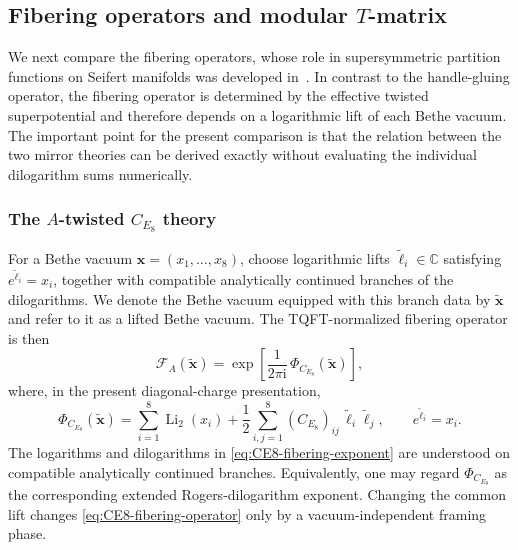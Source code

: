 \documentclass[11pt,a4paper]{article}
\numberwithin{equation}{section}
\begin{document}
\subsection{Fibering operators and modular $T$-matrix}
\label{subsec:fibering-T-matrix}

We next compare the fibering operators, whose role in supersymmetric partition functions on Seifert manifolds was developed in~\cite{Closset:2017zgf,ClossetKimWillett:2018Seifert}.  In contrast to the handle-gluing operator, the fibering operator is determined by the effective twisted superpotential and therefore depends on a logarithmic lift of each Bethe vacuum.  The important point for the present comparison is that the relation between the two mirror theories can be derived exactly without evaluating the individual dilogarithm sums numerically.

\subsubsection{The $A$-twisted $C_{E_8}$ theory}
\label{subsubsec:A-twisted-CE8-T}

For a Bethe vacuum $\boldsymbol x=(x_1,\ldots,x_8)$, choose logarithmic lifts $\widetilde\ell_i\in\mathbb C$ satisfying $e^{\widetilde\ell_i}=x_i$, together with compatible analytically continued branches of the dilogarithms.  We denote the Bethe vacuum equipped with this branch data by $\widetilde{\boldsymbol x}$ and refer to it as a lifted Bethe vacuum.  The TQFT-normalized fibering operator is then
\begin{equation}
  \mathcal F_A(\widetilde{\boldsymbol x})
  =\exp\!\left[
  \frac{1}{2\pi \mathrm{i}}\,
  \Phi_{C_{E_8}}(\widetilde{\boldsymbol x})
  \right],
  \label{eq:CE8-fibering-operator}
\end{equation}
where, in the present diagonal-charge presentation,
\begin{equation}
  \Phi_{C_{E_8}}(\widetilde{\boldsymbol x})
  =
  \sum_{i=1}^{8}\operatorname{Li}_2(x_i)
  +\frac12
  \sum_{i,j=1}^{8}(C_{E_8})_{ij}\,
  \widetilde\ell_i\widetilde\ell_j,
  \qquad
  e^{\widetilde\ell_i}=x_i.
  \label{eq:CE8-fibering-exponent}
\end{equation}
The logarithms and dilogarithms in \eqref{eq:CE8-fibering-exponent} are understood on compatible analytically continued branches.  Equivalently, one may regard $\Phi_{C_{E_8}}$ as the corresponding extended Rogers-dilogarithm exponent.  Changing the common lift changes \eqref{eq:CE8-fibering-operator} only by a vacuum-independent framing phase.
\end{document}
